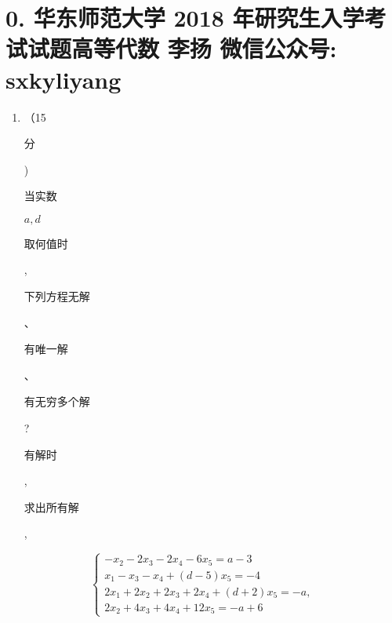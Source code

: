 \documentclass[10pt]{article}
\begin{document}
\section{0. 华东师范大学 2018 年研究生入学考试试题高等代数 
 李扬 
 微信公众号: sxkyliyang}
\begin{enumerate}
  \item （15 \begin{CJK}{UTF8}{mj}分\end{CJK}) \begin{CJK}{UTF8}{mj}当实数\end{CJK} $a, d$ \begin{CJK}{UTF8}{mj}取何值时\end{CJK}, \begin{CJK}{UTF8}{mj}下列方程无解\end{CJK}、\begin{CJK}{UTF8}{mj}有唯一解\end{CJK}、\begin{CJK}{UTF8}{mj}有无穷多个解\end{CJK}?\begin{CJK}{UTF8}{mj}有解时\end{CJK}, \begin{CJK}{UTF8}{mj}求出所有解\end{CJK},
\end{enumerate}
$$
\left\{\begin{array}{l}
-x_{2}-2 x_{3}-2 x_{4}-6 x_{5}=a-3 \\
x_{1}-x_{3}-x_{4}+(d-5) x_{5}=-4 \\
2 x_{1}+2 x_{2}+2 x_{3}+2 x_{4}+(d+2) x_{5}=-a, \\
2 x_{2}+4 x_{3}+4 x_{4}+12 x_{5}=-a+6
\end{array}\right.
$$
\end{document}
